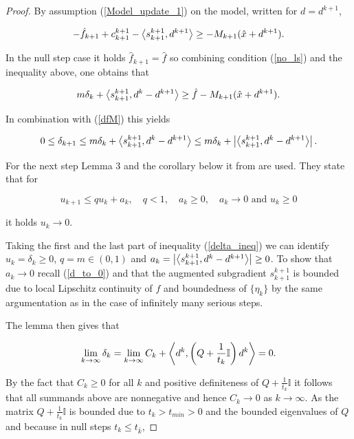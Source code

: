 \begin{proof}
By assumption (\ref{Model_update_1}) on the model, written for \(d=d^{k+1}\),

\begin{equation*}
	-\hat{f}_{k+1}+c^{k+1}_{k+1}-\left\langle s^{k+1}_{k+1},d^{k+1}\right\rangle \geq -M_{k+1}(\hat{x}+d^{k+1}).
\end{equation*}

In the null step case it holds \(\hat{f}_{k+1}=\hat{f}\) so combining condition (\ref{no_ls}) and the inequality above, one obtains that

\begin{equation*}
	m\delta_k+\left\langle s^{k+1}_{k+1},d^k-d^{k+1}\right\rangle \geq \hat{f}-M_{k+1}(\hat{x}+d^{k+1}).
\end{equation*}

In combination with (\ref{dfM}) this yields

\begin{equation}
	0 \leq \delta_{k+1} \leq m\delta_k + \left\langle s^{k+1}_{k+1},d^k-d^{k+1}\right\rangle \leq m\delta_k + \left\vert \left\langle s^{k+1}_{k+1},d^k-d^{k+1}\right\rangle\right\vert.
	\label{delta_ineq}
\end{equation}

For the next step Lemma 3 and the corollary below it from \cite[p. 45]{Polyak1987} are used. They state that for

 \begin{equation*}
	u_{k+1} \leq qu_k + a_k, \quad q < 1, \quad a_k \geq 0, \quad a_k \to 0 \text{ and } u_k \geq 0
\end{equation*}

it holds \(u_k \to 0 \).



Taking the first and the last part of inequality (\ref{delta_ineq}) we can identify \(u_k = \delta_k \geq 0\), \(q = m \in (0,1)\) and \(a_k = \left\vert\left\langle s^{k+1}_{k+1},d^k-d^{k+1}\right\rangle\right\vert \geq 0\). To show that \(a_k \to 0\) recall (\ref{d_to_0}) and that the augmented subgradient \(s^{k+1}_{k+1}\) is bounded due to local Lipschitz continuity of \(f\) and boundedness of \(\{\eta_k\}\) by the same argumentation as in the case of infinitely many serious steps.

The lemma then gives that

\begin{equation*}
	\lim_{k \to \infty} \delta_k = \lim_{k \to \infty} C_k + \left\langle d^k,\left(Q+\frac{1}{t_k}\mathbb{I}\right)d^k\right\rangle = 0.
\end{equation*}

By the fact that \(C_k \geq 0\) for all \(k\) and positive definiteness of \(Q+\frac{1}{t_k}\mathbb{I} \)  it follows that all summands above are nonnegative and hence \(C_k \to 0\) as \(k \to \infty\). As the matrix \(Q+\frac{1}{t_k}\mathbb{I}\) is bounded due to \(t_k > t_{min} > 0\) and the bounded eigenvalues of \(Q\) and because in null steps \(t_k \leq t_{\bar{k}}\),


\end{proof}
